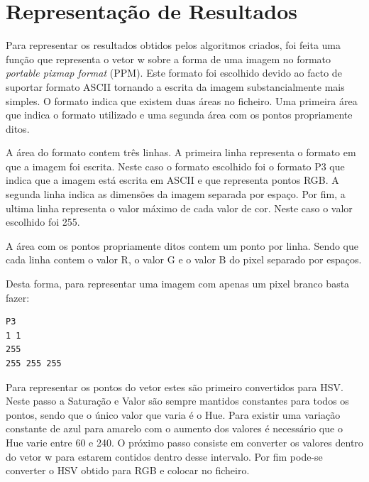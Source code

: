 \documentclass[a4paper]{report}
\begin{document}

\chapter{Representação de Resultados}

Para representar os resultados obtidos pelos algoritmos criados, foi feita uma
função que representa o vetor w sobre a forma de uma imagem no formato
\textit{portable pixmap format} (PPM). Este formato foi escolhido devido ao
facto de suportar formato ASCII tornando a escrita da imagem substancialmente
mais simples. O formato indica que existem duas áreas no ficheiro. Uma primeira
área que indica o formato utilizado e uma segunda área com os pontos
propriamente ditos.

A área do formato contem três linhas. A primeira linha representa o formato em
que a imagem foi escrita. Neste caso o formato escolhido foi o formato P3 que
indica que a imagem está escrita em ASCII e que representa pontos RGB. A segunda
linha indica as dimensões da imagem separada por espaço. Por fim, a ultima linha
representa o valor máximo de cada valor de cor. Neste caso o valor escolhido
foi 255.

A área com os pontos propriamente ditos contem um ponto por linha. Sendo que
cada linha contem o valor R, o valor G e o valor B do pixel separado por espaços.

Desta forma, para representar uma imagem com apenas um pixel branco basta fazer:
\begin{verbatim}
P3
1 1
255
255 255 255
\end{verbatim}

Para representar os pontos do vetor estes são primeiro convertidos para HSV.
Neste passo a Saturação e Valor são sempre mantidos constantes para todos os
pontos, sendo que o único valor que varia é o Hue. Para existir uma variação
constante de azul para amarelo com o aumento dos valores é necessário que o Hue
varie entre 60 e 240. O próximo passo consiste em converter os valores dentro do
vetor w para estarem contidos dentro desse intervalo. Por fim pode-se converter
o HSV obtido para RGB e colocar no ficheiro.
\end{document}
